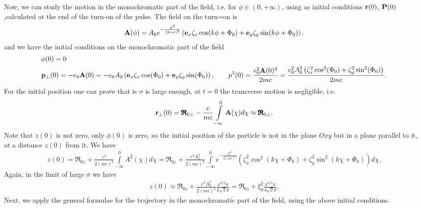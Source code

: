 Now, we can study the motion in the monochromatic part of the field, i.e. for \(\phi\in(0,+\infty)\), using as initial conditions
\({\bf r}(0)\), \({\bf P}(0)\),calculated at the end of the turn-on of the pulse. The field on the turn=on is
\begin{align}
    {\bf  A}(\phi) = A_0 e^{-\frac{\phi^2}{(2\pi \sigma)^2}} \left( {\bf e}_x \zeta_x \cos(k \phi + \Phi_0) + {\bf e}_y \zeta_y \sin(k \phi + \Phi_0) \right).
\end{align}
and we have the initial conditions on the monochromatic part of the field
\begin{align}
     & \phi(0) = 0                                                                                                                                                                                                                                                       \\
     & {\bf p}_\perp(0) =-e_0 {\bf A}(0)= -e_0 A_0 \left( {\bf e}_x \zeta_x \cos(\Phi_0) + {\bf e}_y \zeta_y \sin(\Phi_0) \right),\qquad p^3(0) = \frac{e_0^2{\bf A}(0)^2}{2mc} =\frac{e_0^2 A_0^2\left(\zeta_x^2\cos^2(\Phi_0) + \zeta_y^2\sin^2(\Phi_0)\right) }{2mc}.
\end{align}
For the initial position one can prove that is \(\sigma\) is large enough, at \(t=0\) the transverse motion is negligible, i.e.
\begin{align}
    {\bf r}_{\perp}(0) = {\pmb{\mathfrak R}}_{0\perp}-\frac{e}{mc} \int\limits_{-\infty}^{0} {\bf A}(\chi) d\chi \approx {\pmb{\mathfrak R}}_{0\perp}.
\end{align}
Note that \(z(0)\) is not zero, only \(\phi(0)\) is zero, so the initial position of the particle is not in the plane \(Oxy\) but in a plane parallel to it, at a distance \(z(0)\) from it.
We have
\begin{align}
    z(0) = {\mathfrak{R}}_{0z}+ \frac{e^2}{2(mc)^2} \int\limits_{-\infty}^{0} A^2(\chi) d\chi = {\mathfrak{R}}_{0z} + \frac{e^2 A_0^2}{2(mc)^2} \int\limits_{-\infty}^{0} e^{-\frac{\chi^2}{2(\pi \sigma)^2}} \left( \zeta_x^2\cos^2(k \chi + \Phi_0) + \zeta_y^2\sin^2(k \chi + \Phi_0) \right) d\chi.
\end{align}
Again, in the limit of large \(\sigma\) we have
\begin{align}
    z(0) \approx {\mathfrak{R}}_{0z} + \frac{e^2 A_0^2}{2(mc)^2} \frac{\pi^{3/2}\sigma}{2\sqrt{2}k}= {\mathfrak{R}}_{0z} +\xi_0^2 \frac{\pi^{3/2}\sigma}{4\sqrt{2}k}.
\end{align}
Next, we apply the general formulae for the trajectory in the monochromatic part of the field, using the above initial conditions.
